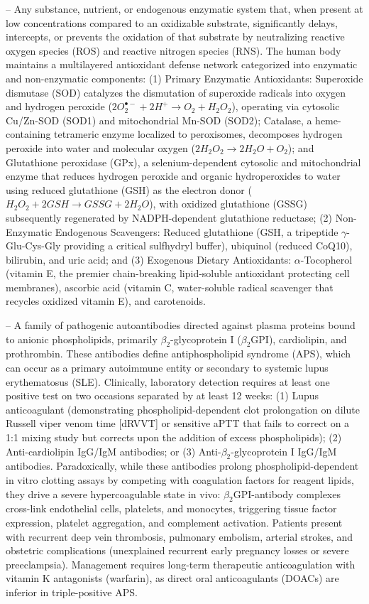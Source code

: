-- Any substance, nutrient, or endogenous enzymatic system that, when present at low concentrations compared to an oxidizable substrate, significantly delays, intercepts, or prevents the oxidation of that substrate by neutralizing reactive oxygen species (ROS) and reactive nitrogen species (RNS). The human body maintains a multilayered antioxidant defense network categorized into enzymatic and non-enzymatic components: (1) Primary Enzymatic Antioxidants: Superoxide dismutase (SOD) catalyzes the dismutation of superoxide radicals into oxygen and hydrogen peroxide ($2 O_2^{\bullet-} + 2 H^+ \to O_2 + H_2O_2$), operating via cytosolic Cu/Zn-SOD (SOD1) and mitochondrial Mn-SOD (SOD2); Catalase, a heme-containing tetrameric enzyme localized to peroxisomes, decomposes hydrogen peroxide into water and molecular oxygen ($2 H_2O_2 \to 2 H_2O + O_2$); and Glutathione peroxidase (GPx), a selenium-dependent cytosolic and mitochondrial enzyme that reduces hydrogen peroxide and organic hydroperoxides to water using reduced glutathione (GSH) as the electron donor ($H_2O_2 + 2 GSH \to GSSG + 2 H_2O$), with oxidized glutathione (GSSG) subsequently regenerated by NADPH-dependent glutathione reductase; (2) Non-Enzymatic Endogenous Scavengers: Reduced glutathione (GSH, a tripeptide $\gamma$-Glu-Cys-Gly providing a critical sulfhydryl buffer), ubiquinol (reduced CoQ10), bilirubin, and uric acid; and (3) Exogenous Dietary Antioxidants: $\alpha$-Tocopherol (vitamin E, the premier chain-breaking lipid-soluble antioxidant protecting cell membranes), ascorbic acid (vitamin C, water-soluble radical scavenger that recycles oxidized vitamin E), and carotenoids.

-- A family of pathogenic autoantibodies directed against plasma proteins bound to anionic phospholipids, primarily $\beta_2$-glycoprotein I ($\beta_2$GPI), cardiolipin, and prothrombin. These antibodies define antiphospholipid syndrome (APS), which can occur as a primary autoimmune entity or secondary to systemic lupus erythematosus (SLE). Clinically, laboratory detection requires at least one positive test on two occasions separated by at least 12 weeks: (1) Lupus anticoagulant (demonstrating phospholipid-dependent clot prolongation on dilute Russell viper venom time [dRVVT] or sensitive aPTT that fails to correct on a 1:1 mixing study but corrects upon the addition of excess phospholipids); (2) Anti-cardiolipin IgG/IgM antibodies; or (3) Anti-$\beta_2$-glycoprotein I IgG/IgM antibodies. Paradoxically, while these antibodies prolong phospholipid-dependent in vitro clotting assays by competing with coagulation factors for reagent lipids, they drive a severe hypercoagulable state in vivo: $\beta_2$GPI-antibody complexes cross-link endothelial cells, platelets, and monocytes, triggering tissue factor expression, platelet aggregation, and complement activation. Patients present with recurrent deep vein thrombosis, pulmonary embolism, arterial strokes, and obstetric complications (unexplained recurrent early pregnancy losses or severe preeclampsia). Management requires long-term therapeutic anticoagulation with vitamin K antagonists (warfarin), as direct oral anticoagulants (DOACs) are inferior in triple-positive APS.

